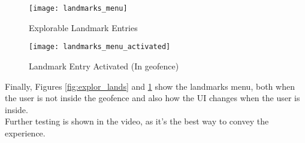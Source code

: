 \begin{figure}[!htb]
        \texttt{[image: landmarks\_menu]}
            \caption{Explorable Landmark Entries}
            \label{fig:explor_lands}
    \endminipage\hfill
        \texttt{[image: landmarks\_menu\_activated]}
        \caption{Landmark Entry Activated (In geofence)}
        \label{fig:active_land}
    \endminipage
    \end{figure}
\noindent
Finally, Figures \ref{fig:explor_lands} and \ref{fig:active_land} show the landmarks menu, both 
when the user is not inside the geofence and also how the UI changes when the user is inside.\\
Further testing is shown in the video, as it's the best way to convey the experience.
